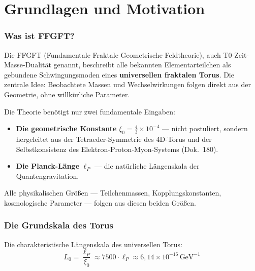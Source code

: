 
\part{Grundlagen und Motivation}

\section{Was ist FFGFT?}

Die FFGFT (Fundamentale Fraktale Geometrische Feldtheorie), auch
T0-Zeit-Masse-Dualität genannt, beschreibt alle bekannten Elementarteilchen
als gebundene Schwingungsmoden eines \textbf{universellen fraktalen Torus}.
Die zentrale Idee: Beobachtete Massen und Wechselwirkungen folgen direkt
aus der Geometrie, ohne willkürliche Parameter.

Die Theorie benötigt nur zwei fundamentale Eingaben:

\begin{itemize}
  \item \textbf{Die geometrische Konstante}
    $\xi_0 = \frac{4}{3}\times 10^{-4}$ — nicht postuliert, sondern
    hergeleitet aus der Tetraeder-Symmetrie des 4D-Torus und der
    Selbstkonsistenz des Elektron-Proton-Myon-Systems (Dok.~180).
  \item \textbf{Die Planck-Länge} $\ell_P$ — die natürliche Längenskala
    der Quantengravitation.
\end{itemize}

Alle physikalischen Größen — Teilchenmassen, Kopplungskonstanten,
kosmologische Parameter — folgen aus diesen beiden Größen.

\section{Die Grundskala des Torus}

Die charakteristische Längenskala des universellen Torus:
\begin{equation}
  L_0 = \frac{\ell_P}{\xi_0}
  \approx 7500 \cdot \ell_P
  \approx 6{,}14 \times 10^{-16}\,\text{GeV}^{-1}
\end{equation}

